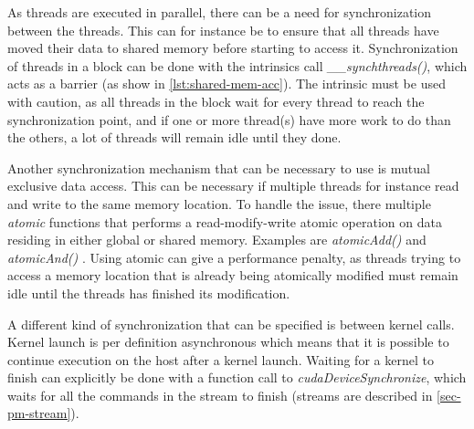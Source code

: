 As threads are executed in parallel, there can be a need for synchronization between the threads.
This can for instance be to ensure that all threads have moved their data to shared memory before starting to access it.
Synchronization of threads in a block can be done with the intrinsics call \textit{\_\_synchthreads()}, which acts as a barrier (as show in \autoref{lst:shared-mem-acc}).
The intrinsic must be used with caution, as all threads in the block wait for every thread to reach the synchronization point, and if one or more thread(s) have more work to do than the others, a lot of threads will remain idle until they done.

Another synchronization mechanism that can be necessary to use is mutual exclusive data access.
This can be necessary if multiple threads for instance read and write to the same memory location.
To handle the issue, there multiple \textit{atomic} functions that performs a read-modify-write atomic operation on data residing in either global or shared memory.
Examples are \textit{atomicAdd()} and \textit{atomicAnd()} \cite{cuda:programmingguide}.
Using atomic can give a performance penalty, as threads trying to access a memory location that is already being atomically modified must remain idle until the threads has finished its modification.

A different kind of synchronization that can be specified is between kernel calls.
Kernel launch is per definition asynchronous which means that it is possible to continue execution on the host after a kernel launch.
Waiting for a kernel to finish can explicitly be done with a function call to \textit{cudaDeviceSynchronize}, which waits for all the commands in the stream to finish (streams are described in \autoref{sec-pm-stream}).
